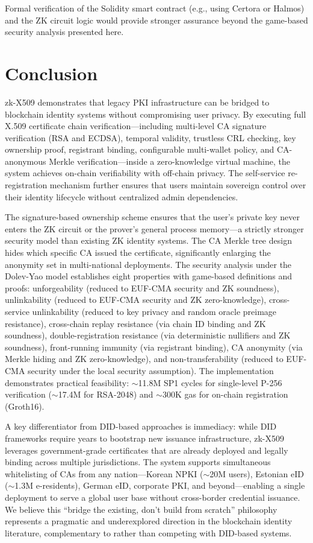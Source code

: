 \documentclass[11pt, a4paper]{article}
\begin{document}
Formal verification of the Solidity smart contract (e.g., using Certora
or Halmos) and the ZK circuit logic would provide stronger assurance
beyond the game-based security analysis presented here.


\section{Conclusion}\label{conclusion}

zk-X509 demonstrates that legacy PKI infrastructure can be bridged to
blockchain identity systems without compromising user privacy. By
executing full X.509 certificate chain verification---including
multi-level CA signature verification (RSA and ECDSA), temporal
validity, trustless CRL checking, key ownership proof, registrant
binding, configurable multi-wallet policy, and CA-anonymous Merkle
verification---inside a zero-knowledge virtual machine, the system
achieves on-chain verifiability with off-chain privacy. The self-service
re-registration mechanism further ensures that users maintain sovereign
control over their identity lifecycle without centralized admin
dependencies.

The signature-based ownership scheme ensures that the user's private key
never enters the ZK circuit or the prover's general process memory---a
strictly stronger security model than existing ZK identity systems. The
CA Merkle tree design hides which specific CA issued the certificate,
significantly enlarging the anonymity set in multi-national deployments.
The security analysis under the Dolev-Yao model establishes eight
properties with game-based definitions and proofs: unforgeability
(reduced to EUF-CMA security and ZK soundness), unlinkability (reduced
to EUF-CMA security and ZK zero-knowledge), cross-service unlinkability
(reduced to key privacy and random oracle preimage resistance), cross-chain replay resistance
(via chain ID binding and ZK soundness), double-registration
resistance (via deterministic nullifiers and ZK soundness),
front-running immunity (via registrant binding), CA anonymity (via
Merkle hiding and ZK zero-knowledge), and non-transferability (reduced
to EUF-CMA security under the local security assumption). The
implementation demonstrates practical feasibility: $\sim$11.8M
SP1 cycles for single-level P-256 verification ($\sim$17.4M for
RSA-2048) and $\sim$300K gas for on-chain registration
(Groth16).

A key differentiator from DID-based approaches is immediacy: while DID
frameworks require years to bootstrap new issuance infrastructure,
zk-X509 leverages government-grade certificates that are already
deployed and legally binding across multiple jurisdictions. The system
supports simultaneous whitelisting of CAs from any nation---Korean NPKI
($\sim$20M users), Estonian eID ($\sim$1.3M
e-residents), German eID, corporate PKI, and beyond---enabling a single
deployment to serve a global user base without cross-border credential
issuance. We believe this ``bridge the existing, don't build from
scratch'' philosophy represents a pragmatic and underexplored direction
in the blockchain identity literature, complementary to rather than
competing with DID-based systems.
\end{document}
